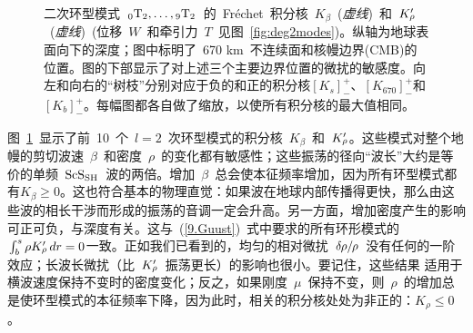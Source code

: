 \begin{figure}[!b]
\begin{center}
\end{center}
\caption[torkernels1]{\label{9.fig.tor1}
二次环型模式~${}_0{\rm T}_2, \ldots,{}_9{\rm T}_2$~的~Fr\'{e}chet~积分核~$K_{\beta}$~({\em 虚线\/})~和~$K_{\raisebox{0.3 ex}{\scriptsize$\rho$}}^{\prime}$~({\em 虚线\/})~(位移~$W$~和牵引力~$T$~见图~\ref{fig:deg2modes})。纵轴为地球表面向下的深度；图中标明了~670 km~不连续面和核幔边界(CMB)的位置。图的下部显示了对上述三个主要边界位置的微扰的敏感度。向左和向右的“树枝”分别对应于负的和正的积分核$[K_s]^+_-$、$[K_{670}]^+_-$和$[K_b]^+_-$。每幅图都各自做了缩放，以使所有积分核的最大值相同。
}
\end{figure}
图~\ref{9.fig.tor1}~显示了前~10~个~$l=2$~次环型模式的积分核~$K_{\beta}$~和~$K_{\raisebox{0.3 ex}{\scriptsize$\rho$}}^{\prime}$。这些模式对整个地幔的剪切波速~$\beta$~和密度~$\rho$~的变化都有敏感性；这些振荡的径向“波长”大约是等价的单频~${\rm ScS}_{\rm SH}$~波的两倍。增加~$\beta$~总会使本征频率增加，因为所有环型模式都有$K_{\beta}\geq 0$。这也符合基本的物理直觉：如果波在地球内部传播得更快，那么由这些波的相长干涉而形成的振荡的音调一定会升高。另一方面，增加密度产生的影响可正可负，与深度有关。这与~(\ref{9.Guust})~式中要求的所有环形模式的$\int_b^s\rho K_{\raisebox{0.3 ex}{\scriptsize$\rho$}}^{\prime}\,dr=0$一致。正如我们已看到的，均匀的相对微扰~$\delta\hspace{-0.2 mm}\rho/\hspace{-0.3 mm}\rho$~没有任何的一阶效应；长波长微扰（比~$K_{\raisebox{0.3 ex}{\scriptsize$\rho$}}^{\prime}$~振荡更长）的影响也很小。要记住，这些结果
适用于横波速度保持不变时的密度变化；反之，如果刚度~$\mu$~保持不变，则~$\rho$~的增加总是使环型模式的本征频率下降，因为此时，相关的积分核处处为非正的：$K_{\rho}\leq 0$。
